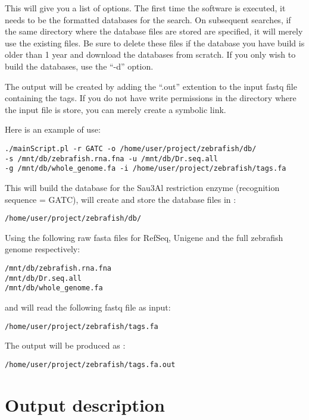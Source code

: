 \documentclass[a4paper,12pt]{article}
\begin{document}
This will give you a list of options. The first time the software is executed, it needs to be the formatted databases for the search. On subsequent searches, if the same directory where the database files are stored are specified, it will merely use the existing files. Be sure to delete these files if the database you have build is older than 1 year and download the databases from scratch. If you only wish to build the databases, use the ``-d'' option. 

The output will be created by adding the ``.out'' extention to the input fastq file containing the tags. If you do not have write permissions in the directory where the input file is store, you can merely create a symbolic link.

Here is an example of use:

\small{
\begin{verbatim}
./mainScript.pl -r GATC -o /home/user/project/zebrafish/db/ 
-s /mnt/db/zebrafish.rna.fna -u /mnt/db/Dr.seq.all 
-g /mnt/db/whole_genome.fa -i /home/user/project/zebrafish/tags.fa
\end{verbatim}
}

This will build the database for the Sau3Al restriction enzyme (recognition sequence = GATC), will create and store the database files in :
\begin{verbatim}
/home/user/project/zebrafish/db/ 
\end{verbatim}
Using the following raw fasta files for RefSeq, Unigene and the full zebrafish genome respectively:

\begin{verbatim}
/mnt/db/zebrafish.rna.fna
/mnt/db/Dr.seq.all 
/mnt/db/whole_genome.fa
\end{verbatim}
and will read the following fastq file as input:
\begin{verbatim}
/home/user/project/zebrafish/tags.fa
\end{verbatim}
The output will be produced as :
\begin{verbatim}
/home/user/project/zebrafish/tags.fa.out
\end{verbatim}

 



\section{Output description}
\label{sec:outformat}
\end{document}
